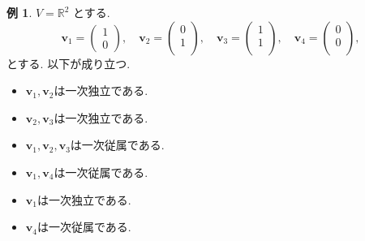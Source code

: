 \documentclass[dvipdfmx,a4paper,11pt]{article} %
\theoremstyle{definition}
\newtheorem{ex}[thm]{例}
\begin{document}
\begin{ex}
$V=\mathbb{R}^2$ とする.
\[
\bm{v}_1=
\begin{pmatrix}
1\\
0
\end{pmatrix},
\quad
\bm{v}_2=
\begin{pmatrix}
0\\
1\\
\end{pmatrix},
\quad
\bm{v}_3=
\begin{pmatrix}
1\\
1\\
\end{pmatrix},
\quad
\bm{v}_4=
\begin{pmatrix}
0\\
0\\
\end{pmatrix},
\]
とする. 以下が成り立つ. 
\begin{itemize}
\item $\bm{v}_1, \bm{v}_2$は一次独立である. 
\item  $\bm{v}_2, \bm{v}_3$は一次独立である. 
\item  $\bm{v}_1, \bm{v}_2, \bm{v}_3$は一次従属である. 
\item  $\bm{v}_1, \bm{v}_4$は一次従属である. 
\item  $\bm{v}_1$は一次独立である. 
\item  $\bm{v}_4$は一次従属である. 
\end{itemize}

\end{ex}
\end{document}
